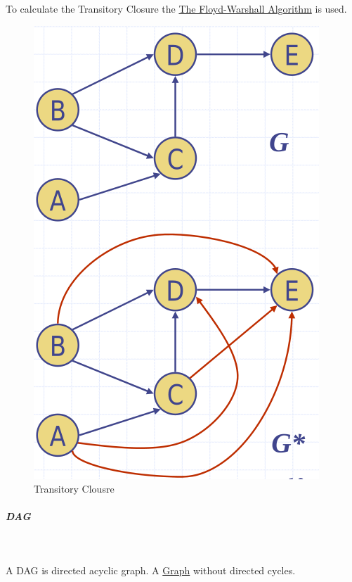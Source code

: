 \documentclass[11pt,twoside,twocolumn,landscape]{article}
\begin{document}
To calculate the Transitory Closure the \href{../../../roam/20220202113404-the_floyd_warshall_algorithm.org}{The Floyd-Warshall Algorithm} is used.


\begin{figure}[htbp]
\centering
\includegraphics[width=.9\linewidth]{img/transitiver_abschluss.png}
\caption{\label{fig:orge58c570}Transitory Clousre}
\end{figure}

\subparagraph{DAG} \
\label{sec:org09da1c6}

A DAG is directed acyclic graph.
A \href{../../../roam/20220201163000-graph.org}{Graph} without directed cycles.
\end{document}
